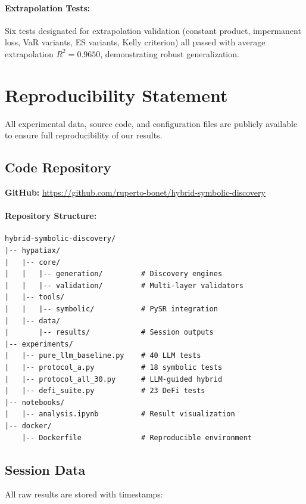 \paragraph{Extrapolation Tests:} Six tests designated for extrapolation validation (constant product, impermanent loss, VaR variants, ES variants, Kelly criterion) all passed with average extrapolation $R^2 = 0.9650$, demonstrating robust generalization.

\section{Reproducibility Statement}
\label{app:reproducibility}

All experimental data, source code, and configuration files are publicly available to ensure full reproducibility of our results.

\subsection{Code Repository}

\textbf{GitHub:} \url{https://github.com/ruperto-bonet/hybrid-symbolic-discovery}

\paragraph{Repository Structure:}
\begin{small}
\begin{verbatim}
hybrid-symbolic-discovery/
|-- hypatiax/
|   |-- core/
|   |   |-- generation/         # Discovery engines
|   |   |-- validation/         # Multi-layer validators
|   |-- tools/
|   |   |-- symbolic/           # PySR integration
|   |-- data/
|       |-- results/            # Session outputs
|-- experiments/
|   |-- pure_llm_baseline.py    # 40 LLM tests
|   |-- protocol_a.py           # 18 symbolic tests
|   |-- protocol_all_30.py      # LLM-guided hybrid
|   |-- defi_suite.py           # 23 DeFi tests
|-- notebooks/
|   |-- analysis.ipynb          # Result visualization
|-- docker/
    |-- Dockerfile              # Reproducible environment
\end{verbatim}
\end{small}

\subsection{Session Data}

All raw results are stored with timestamps:

